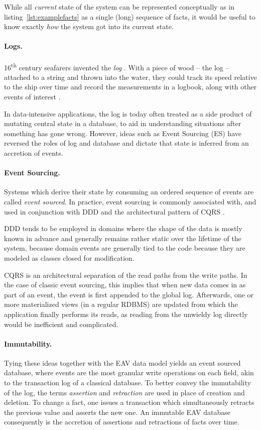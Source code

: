 While all \emph{current} state of the system can be represented conceptually as in listing~\ref{lst:examplefacts} as a single (long) sequence of facts, it would be useful to know exactly \emph{how} the system got into its current state.


\paragraph{Logs.} 16\textsuperscript{th} century seafarers invented the \emph{log} \cite{may1973historylog}. With a piece of wood -- the log -- attached to a string and thrown into the water, they could track its speed relative to the ship over time and record the measurements in a logbook, along with other events of interest \cite{kakkar19log}.

In data-intensive applications, the log is today often treated as a side product of mutating central state in a database, to aid in understanding situations after something has gone wrong. However, ideas such as Event Sourcing (ES) have reversed the roles of log and database and dictate that state is inferred from an accretion of events.

\cleardoublepage
\paragraph{Event Sourcing.} Systems which derive their state by consuming an ordered sequence of events are called \emph{event sourced}. In practice, event sourcing is commonly associated with, and used in conjunction with \gls{DDD} \cite{evans2004domain} and the architectural pattern of \gls{CQRS} \cite{kabbedijk2012case}.

DDD tends to be employed in domains where the shape of the data is mostly known in advance and generally remains rather static over the lifetime of the system, because domain events are generally tied to the code because they are modeled as classes closed for modification.

CQRS is an architectural separation of the read paths from the write paths. In the case of classic event sourcing, this implies that when new data comes in as part of an event, the event is first appended to the global log. Afterwards, one or more materialized views (in a regular RDBMS) are updated from which the application finally performs its reads, as reading from  the unwieldy log directly would be inefficient and complicated.

\paragraph{Immutability.} Tying these ideas together with the EAV data model yields an event sourced database, where events are the most granular write operations on each field, akin to the transaction log of a classical database. To better convey the immutability of the log, the terms \emph{assertion} and \emph{retraction} are used in place of creation and deletion. To change a fact, one issues a transaction which simultaneously retracts the previous value and asserts the new one. An immutable EAV database consequently is the accretion of assertions and retractions of facts over time.

